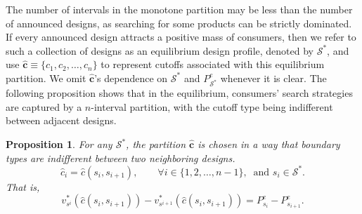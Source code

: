 \documentclass[14pt]{article}
\theoremstyle{plain}
\newtheorem{prop}[thm]{Proposition}
\theoremstyle{definition}
\theoremstyle{remark}
\DeclareRobustCommand\1{\futurelet\oneNext\oneCheck}
\renewcommand{\S}{\mathcal{S}}
\begin{document}
The number of intervals in the monotone partition may be less than the number of announced designs, as searching for some products can be strictly dominated. If every announced design attracts a positive mass of consumers, then we refer to such a collection of designs as an equilibrium design profile, denoted by $\S^*$, and use $\mathbf{\hat{c}}\equiv \{c_1, c_2, \dots, c_n\}$ to represent cutoffs associated with this equilibrium partition. We omit $\mathbf{\hat{c}}$'s dependence on $\S^*$ and $P^e_{\S^*}$ whenever it is clear. The following proposition shows that in the equilibrium, consumers' search strategies are captured by a $n$-interval partition, with the cutoff type being indifferent between adjacent designs.


\begin{prop}\label{prop:partition}
For any $\S^*$, the partition $\mathbf{\hat{c}}$ is chosen in a way that boundary types are indifferent between two neighboring designs.
\begin{equation}\label{eq:partition_characterization}
    \hat{c}_i = \hat{c}(s_{i},s_{i+1}),\qquad \forall i \in \{1,2, \dots, n-1\},\:\text{ and } s_i \in \S^*.
\end{equation}
 That is, 
\begin{equation}\label{eq:boundary_consumer_indifferent}
    v_{s^i}^*(\hat{c}(s_i, s_{i+1}))-v_{s^{i+1}}^*(\hat{c}(s_i, s_{i+1}))= P_{s_i}^e - P_{s_{i+1}}^e.
\end{equation}
\end{prop}
\end{document}
